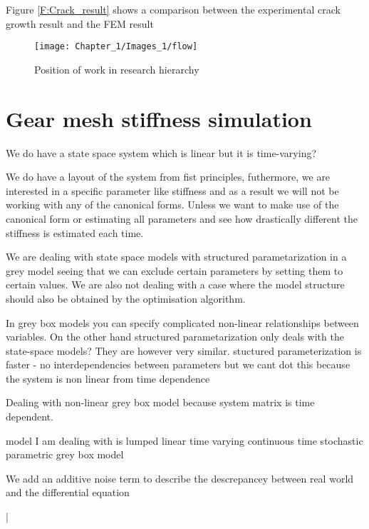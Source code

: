 Figure \ref{F:Crack_result} shows a comparison between the experimental crack growth result and the FEM result
\begin{figure}[H]
	\centering
	\texttt{[image: Chapter\_1/Images\_1/flow]}
	\caption{Position of work in research hierarchy}
	\label{F:Hierarchy}
\end{figure}




\section{Gear mesh stiffness simulation}


We do have a state space system which is linear but it is time-varying?

We do have a layout of the system from fist principles, futhermore, we are interested in a specific parameter like stiffness and as a result we will not be working with any of the canonical forms. Unless we want to make use of the canonical form or estimating all parameters and see how drastically different the stiffness is estimated each time.

We are dealing with state space models with structured parametarization in a grey model seeing that we can exclude certain parameters by setting them to certain values. We are also not dealing with a case where the model structure should also be obtained by the optimisation algorithm.

In grey box models you can specify complicated non-linear relationships between variables. On the other hand structured parametarization only deals with the state-space models? They are however very similar. stuctured parameterization is faster - no interdependencies between parameters but we cant dot this because the system is non linear from time dependence

Dealing with non-linear grey box model because system matrix is time dependent.

model I am dealing with is lumped linear time varying continuous time stochastic parametric grey box model


We add an additive noise term to describe the descrepancey between real world and the differential equation





|